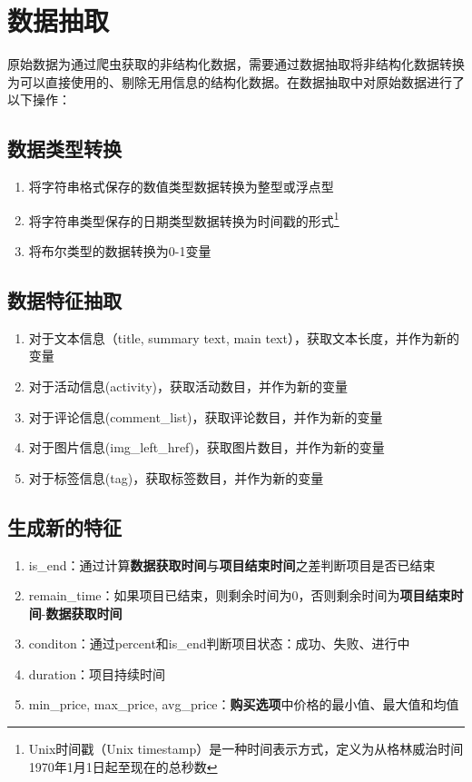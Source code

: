 \documentclass[lang=cn,a4paper]{elegantpaper}
\begin{document}
\begin{table}
\end{table}



\section{数据抽取}
原始数据为通过爬虫获取的非结构化数据，需要通过数据抽取将非结构化数据转换为可以直接使用的、剔除无用信息的结构化数据。在数据抽取中对原始数据进行了以下操作：
\subsection{数据类型转换}
\begin{enumerate}
\item 将字符串格式保存的数值类型数据转换为整型或浮点型
\item 将字符串类型保存的日期类型数据转换为时间戳的形式\footnote{Unix时间戳（Unix timestamp）是一种时间表示方式，定义为从格林威治时间1970年1月1日起至现在的总秒数}
\item 将布尔类型的数据转换为0-1变量
\end{enumerate}

\subsection{数据特征抽取}
\begin{enumerate}
\item 对于文本信息（title, summary text, main text），获取文本长度，并作为新的变量
\item 对于活动信息(activity)，获取活动数目，并作为新的变量
\item 对于评论信息(comment\_list)，获取评论数目，并作为新的变量
\item 对于图片信息(img\_left\_href)，获取图片数目，并作为新的变量
\item 对于标签信息(tag)，获取标签数目，并作为新的变量
\end{enumerate}

\subsection{生成新的特征}
\begin{enumerate}
\item is\_end：通过计算\textbf{数据获取时间}与\textbf{项目结束时间}之差判断项目是否已结束
\item remain\_time：如果项目已结束，则剩余时间为0，否则剩余时间为\textbf{项目结束时间}-\textbf{数据获取时间}
\item conditon：通过percent和is\_end判断项目状态：成功、失败、进行中
\item duration：项目持续时间
\item min\_price, max\_price, avg\_price：\textbf{购买选项}中价格的最小值、最大值和均值
\end{enumerate}
\end{document}
